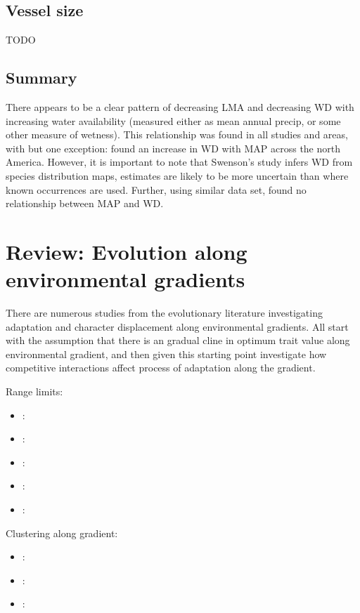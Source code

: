 \documentclass[a4paper,11pt]{article}
\begin{document}
\subsection{Vessel size}

TODO

\subsection{Summary}

There appears to be a clear pattern of decreasing LMA and decreasing WD with increasing water availability (measured either as mean annual precip, or some other measure of wetness). This relationship was found in all studies and areas, with but one exception: \citet{Swenson-2010} found an increase in WD with MAP across the north America. However, it is important to note that Swenson's study infers WD from species distribution maps, estimates are likely to be more uncertain than where known occurrences are used. Further, using similar data set, \citet{Stahl-2015} found no relationship between MAP and WD.


\section{Review: Evolution along environmental gradients}

There are numerous studies from the evolutionary literature investigating adaptation and character displacement along environmental gradients. All start with the assumption that there is an gradual cline in optimum trait value along environmental gradient, and then given this starting point investigate how competitive interactions affect process of adaptation along the gradient.

Range limits:

\begin{itemize}
\item \citep{Kirkpatrick-1997}:
\item \citep{Case-2000}:
\item \citep{Goldberg-2006}:
\item \citep{Bridle-2007}:
\item \citep{Price-2009}:
\end{itemize}

Clustering along gradient:

\begin{itemize}
\item \citep{Doebeli-2003}:
\item \citep{Polechova-2005}:
\item \citep{Leimar-2008}:
\end{itemize}
\end{document}
